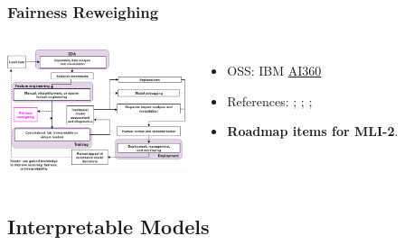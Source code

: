 \documentclass[11pt,
               aspectratio=169,
               hyperref={colorlinks}
               ]{beamer}
\begin{document}
			\begin{frame}
		
				\frametitle{Fairness Reweighing}		
			
				\begin{columns}
	
					\centering
					\includegraphics[height=100pt]{img/fr.png}
				
					\vspace{-5pt}
					\begin{itemize}
						\item OSS: IBM \href{https://github.com/IBM/AIF360}{AI360}
						\item References: ; ; ; 
						\item \textbf{Roadmap items for MLI-2}.
					\end{itemize}
				
				\end{columns}			
			
			\end{frame}
			
		\subsection{Interpretable Models}
			
\end{document}
